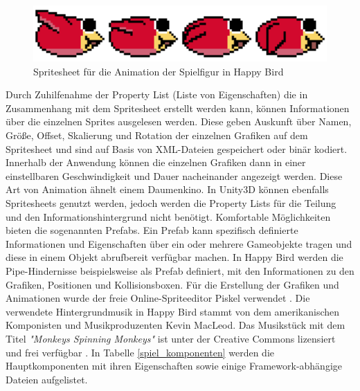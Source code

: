 \begin{figure}[htbp]
	\centering
	\includegraphics[width=1.0\textwidth]{bilder/Red_Bird}
	\caption{Spritesheet für die Animation der Spielfigur in Happy Bird}\label{spritesheet}
\end{figure}

Durch Zuhilfenahme der Property List (Liste von Eigenschaften) die in Zusammenhang mit dem Spritesheet erstellt werden kann, können Informationen über die einzelnen Sprites ausgelesen werden. Diese geben Auskunft über Namen, Größe, Offset, Skalierung und Rotation der einzelnen Grafiken auf dem Spritesheet und sind auf Basis von XML-Dateien gespeichert oder binär kodiert. Innerhalb der Anwendung können die einzelnen Grafiken dann in einer einstellbaren Geschwindigkeit und Dauer nacheinander angezeigt werden. Diese Art von Animation ähnelt einem Daumenkino.
In Unity3D können ebenfalls Spritesheets genutzt werden, jedoch werden die Property Lists für die Teilung und den Informationshintergrund nicht benötigt. Komfortable Möglichkeiten bieten die sogenannten Prefabs. Ein Prefab kann spezifisch definierte Informationen und Eigenschaften über ein oder mehrere Gameobjekte tragen und diese in einem Objekt abrufbereit verfügbar machen. In Happy Bird werden die Pipe-Hindernisse beispielsweise als Prefab definiert, mit den Informationen zu den Grafiken, Positionen und Kollisionsboxen.
Für die Erstellung der Grafiken und Animationen wurde der freie Online-Spriteeditor Piskel verwendet \citep{piskel}. 
Die verwendete Hintergrundmusik in Happy Bird stammt von dem amerikanischen Komponisten und Musikproduzenten Kevin MacLeod. Das Musikstück mit dem Titel \emph{"Monkeys Spinning Monkeys"} ist unter der Creative Commons lizensiert und frei verfügbar \citep{macLeod}. 
In Tabelle \ref{spiel_komponenten} werden die Hauptkomponenten mit ihren Eigenschaften sowie einige Framework-abhängige Dateien aufgelistet.


